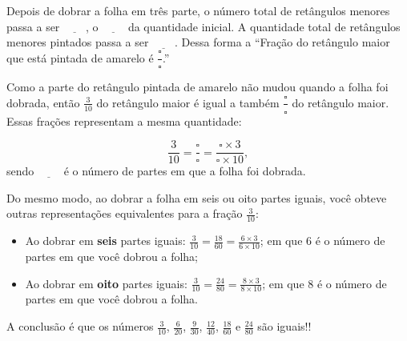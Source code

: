 \begin{refletindo*}
Depois de dobrar a folha em três parte, o número total de retângulos menores passa a ser $\underline{\phantom{1000}}$, o $\underline{\phantom{1000}}$ da quantidade inicial. A  quantidade total de retângulos menores pintados passa a ser $\underline{\phantom{1000}}$. Dessa forma a ``Fração do retângulo maior que está pintada de amarelo é $\dfrac{\square}{\square}$.''

Como a parte do retângulo pintada de amarelo não mudou quando a folha foi dobrada,  então $\frac{3}{10}$ do retângulo maior é igual a também $\dfrac{\square}{\square}$ do retângulo maior. Essas frações representam a mesma quantidade:

$$\dfrac{3}{10} = \dfrac{\square}{\square} = \dfrac{\square \times 3}{\square \times 10},$$
sendo $\underline{\phantom{1000}}$ é o número de partes em que a folha foi dobrada.

Do mesmo modo, ao dobrar a folha em seis ou oito partes iguais, você obteve outras representações equivalentes para a fração $\frac{3}{10}$:
\begin{itemize} %
  \item     Ao dobrar em     {\bf seis}     partes iguais:     $\frac{3}{10} = \frac{18}{60} = \frac{6 \times 3}{6 \times 10}$; em que 6 é o número de partes em que você dobrou a folha;
  \item     Ao dobrar em     {\bf oito}     partes iguais:     $\frac{3}{10} = \frac{24}{80} = \frac{8 \times 3}{8 \times 10}$; em que 8 é o número de partes em que você dobrou a folha.
\end{itemize} %

A conclusão é que os números $\frac{3}{10}$, $\frac{6}{20}$, $\frac{9}{30}$, $\frac{12}{40}$, $\frac{18}{60}$ e $\frac{24}{80}$ são iguais!!

\end{refletindo*}
\clearpage

